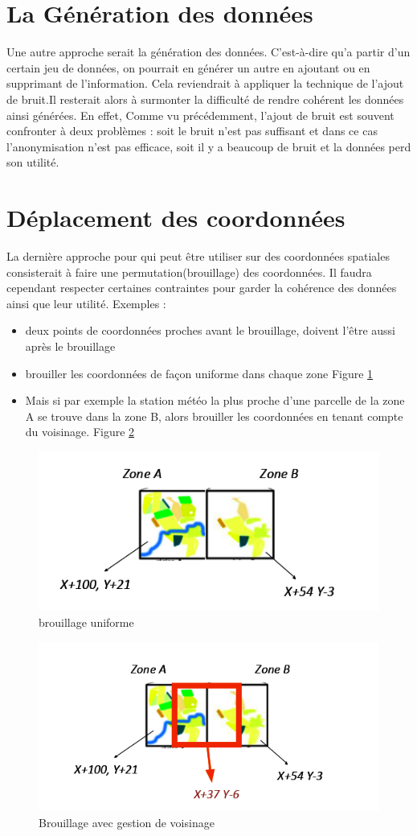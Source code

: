 \section{La Génération des données}
Une autre approche serait la génération des données. C'est-à-dire qu'a partir d'un certain jeu de données, on pourrait en générer un autre en ajoutant ou en supprimant de l'information. Cela reviendrait à appliquer la technique de l'ajout de bruit.Il resterait alors à surmonter la difficulté de rendre cohérent les données ainsi générées. En effet, Comme vu précédemment, l'ajout de bruit est souvent confronter à deux problèmes : soit le bruit n'est pas suffisant et dans ce cas l'anonymisation n'est pas efficace, soit il y a beaucoup de bruit et la données perd son utilité.
\section{Déplacement des coordonnées}
 La dernière approche pour qui peut être utiliser sur des coordonnées spatiales consisterait à faire une permutation(brouillage) des coordonnées. Il faudra cependant respecter certaines contraintes pour garder la cohérence des données ainsi que leur utilité. Exemples : 
 \begin{itemize}
     \item deux points de coordonnées proches avant le brouillage, doivent l'être aussi après le brouillage
     \item brouiller les coordonnées de façon uniforme dans chaque zone Figure \ref{fig:Brouillage uniforme}
     \item Mais si par exemple la station météo la plus proche d’une parcelle de la zone A se trouve dans la zone B, alors brouiller les coordonnées en tenant compte du voisinage. Figure \ref{fig:Brouillage avec gestion de voisinage}
 \end{itemize}
 
 \begin{figure}[!h]
    \centering
    \includegraphics[width=.5\textwidth]{images/anonymisation/brouillage_image1.png}
    \caption{ brouillage uniforme}
    \label{fig:Brouillage uniforme}
\end{figure}
\begin{figure}[!h]
    \centering
    \includegraphics[width=.5\textwidth]{images/anonymisation/brouillage_image2.png}
    \caption{ Brouillage avec gestion de voisinage}
    \label{fig:Brouillage avec gestion de voisinage}
\end{figure}
